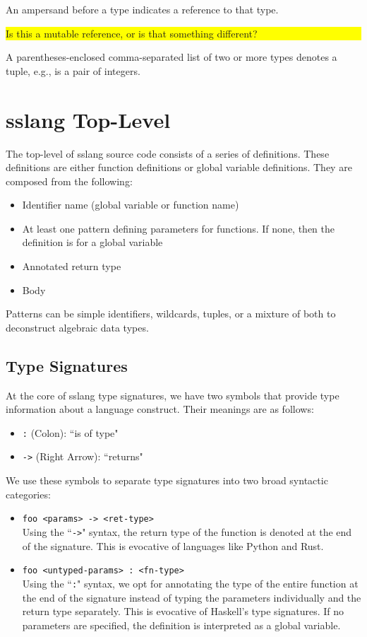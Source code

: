 \documentclass{article}
\newcommand{\fixme}[1]{
  \noindent\colorbox{yellow}{\parbox{\dimexpr\linewidth-2\fboxsep}{#1}}%
}
\begin{document}
An ampersand \lit*{\&} before a type indicates a reference to that type.

\fixme{Is this a mutable reference, or is that something different?}

A parentheses-enclosed comma-separated list of two or more types
denotes a tuple, e.g., \lit*{(}  \lit*{,} 
\lit*{)} is a pair of integers.

\section{sslang Top-Level}
The top-level of sslang source code consists of a series of definitions. These definitions are either function definitions or global variable definitions. They are composed from the following:
\begin{itemize}
    \item Identifier name (global variable or function name)
    \item At least one pattern defining parameters for functions. If none, then the definition is for a global variable
    \item Annotated return type
    \item Body
\end{itemize}

Patterns can be simple identifiers, wildcards, tuples, or a mixture of both to deconstruct algebraic data types.
\subsection{Type Signatures}
At the core of sslang type signatures, we have two symbols that provide type information about a language construct. Their meanings are as follows:
\begin{itemize}
    \item \texttt{:} (Colon): ``is of type"
    \item \texttt{->} (Right Arrow): ``returns"
\end{itemize}

We use these symbols to separate type signatures into two broad syntactic categories:
\begin{itemize}
    \item \texttt{foo <params> -> <ret-type>}\\
          Using the ``\texttt{->}" syntax, the return type of the function is denoted at the end of the signature. This is evocative of languages like Python and Rust.
    \item \texttt{foo <untyped-params> : <fn-type>}\\
          Using the ``\texttt{:}" syntax, we opt for annotating the type of the entire function at the end of the signature instead of typing the parameters individually and the return type separately. This is evocative of Haskell's type signatures. If no parameters are specified, the definition is interpreted as a global variable.
\end{itemize}
\end{document}
